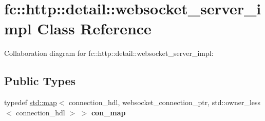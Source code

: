 \hypertarget{classfc_1_1http_1_1detail_1_1websocket__server__impl}{}\section{fc\+:\+:http\+:\+:detail\+:\+:websocket\+\_\+server\+\_\+impl Class Reference}
\label{classfc_1_1http_1_1detail_1_1websocket__server__impl}


Collaboration diagram for fc\+:\+:http\+:\+:detail\+:\+:websocket\+\_\+server\+\_\+impl\+:
\subsection*{Public Types}
\begin{DoxyCompactItemize}
\item 
\mbox{\label{classfc_1_1http_1_1detail_1_1websocket__server__impl_ae9d748240a56b123a127056e98bb12c6}} 
typedef \mbox{\hyperlink{classstd_1_1map}{std\+::map}}$<$ connection\+\_\+hdl, websocket\+\_\+connection\+\_\+ptr, std\+::owner\+\_\+less$<$ connection\+\_\+hdl $>$ $>$ {\bfseries con\+\_\+map}
\end{DoxyCompactItemize}
